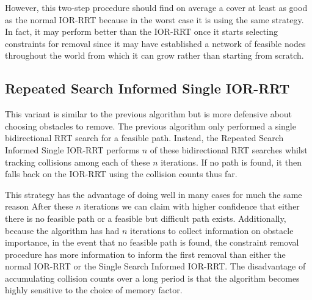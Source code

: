 However, this two-step procedure should find on average a cover at least as good as the normal IOR-RRT because in the worst case it is using the same strategy. In fact, it may perform better than the IOR-RRT once it starts selecting constraints for removal since it may have established a network of feasible nodes throughout the world from which it can grow rather than starting from scratch.

\subsection{Repeated Search Informed Single IOR-RRT}
This variant is similar to the previous algorithm but is more defensive about choosing obstacles to remove. The previous algorithm only performed a single bidirectional RRT search for a feasible path. Instead, the Repeated Search Informed Single IOR-RRT performs $n$ of these bidirectional RRT searches whilst tracking collisions among each of these $n$ iterations. If no path is found, it then falls back on the IOR-RRT using the collision counts thus far.

This strategy has the advantage of doing well in many cases for much the same reason After these $n$ iterations we can claim with higher confidence that either there is no feasible path or a feasible but difficult path exists. Additionally, because the algorithm has had $n$ iterations to collect information on obstacle importance, in the event that no feasible path is found, the constraint removal procedure has more information to inform the first removal than either the normal IOR-RRT or the Single Search Informed IOR-RRT. The disadvantage of accumulating collision counts over a long period is that the algorithm becomes highly sensitive to the choice of memory factor.
